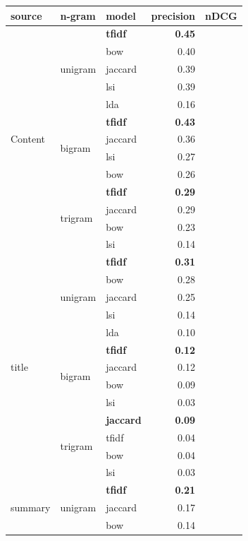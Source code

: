 \begin{table}[]
\centering
\begin{tabular}{lllrl}
\hline
source & n-gram & model & \multicolumn{1}{l}{precision} & nDCG \\ \hline
\multirow{13}{*}{Content} & \multirow{5}{*}{unigram} & \textbf{tfidf} & \textbf{0.45} &  \\
 &  & bow & 0.40 &  \\
 &  & jaccard & 0.39 &  \\
 &  & lsi & 0.39 &  \\
 &  & lda & 0.16 &  \\ \cline{2-5} 
 & \multirow{4}{*}{bigram} & \textbf{tfidf} & \textbf{0.43} & \textbf{} \\
 &  & jaccard & 0.36 &  \\
 &  & lsi & 0.27 &  \\
 &  & bow & 0.26 &  \\ \cline{2-5} 
 & \multirow{4}{*}{trigram} & \textbf{tfidf} & \textbf{0.29} & \textbf{} \\
 &  & jaccard & 0.29 &  \\
 &  & bow & 0.23 &  \\
 &  & lsi & 0.14 &  \\ \hline
\multirow{13}{*}{title} & \multirow{5}{*}{unigram} & \textbf{tfidf} & \textbf{0.31} & \textbf{} \\
 &  & bow & 0.28 &  \\
 &  & jaccard & 0.25 &  \\
 &  & lsi & 0.14 &  \\
 &  & lda & 0.10 &  \\ \cline{2-5} 
 & \multirow{4}{*}{bigram} & \textbf{tfidf} & \textbf{0.12} & \textbf{} \\
 &  & jaccard & 0.12 &  \\
 &  & bow & 0.09 &  \\
 &  & lsi & 0.03 &  \\ \cline{2-5} 
 & \multirow{4}{*}{trigram} & \textbf{jaccard} & \textbf{0.09} & \textbf{} \\
 &  & tfidf & 0.04 &  \\
 &  & bow & 0.04 &  \\
 &  & lsi & 0.03 &  \\ \hline
\multirow{13}{*}{summary} & \multirow{5}{*}{unigram} & \textbf{tfidf} & \textbf{0.21} & \textbf{} \\
 &  & jaccard & 0.17 &  \\
 &  & bow & 0.14 &  \\

\end{tabular}
\end{table}
